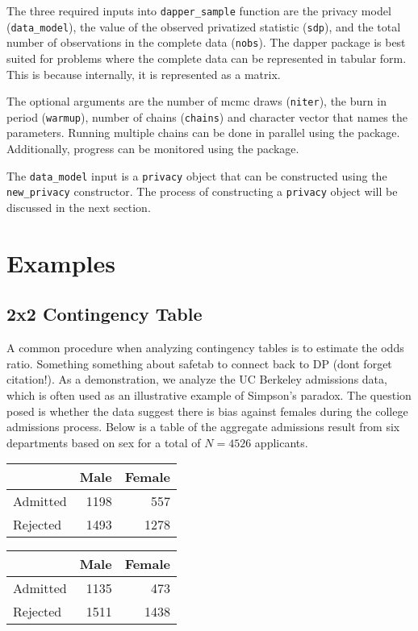 The three required inputs into \texttt{dapper\_sample} function are the privacy model (\texttt{data\_model}), the value
of the observed privatized statistic (\texttt{sdp}), and the total number of observations
in the complete data (\texttt{nobs}). The dapper
package is best suited for problems where the complete data can be represented in
tabular form. This is because internally, it is represented as a matrix.

The optional arguments are the number of mcmc draws (\texttt{niter}), the
burn in period (\texttt{warmup}), number of chains (\texttt{chains}) and character
vector that names the parameters. Running multiple chains can be done in parallel
using the  package. Additionally, progress can be monitored
using the  package.

The \texttt{data\_model} input is a \texttt{privacy}
object that can be constructed using the \texttt{new\_privacy} constructor. The
process of constructing a \texttt{privacy} object will be discussed in the next section.

\hypertarget{examples}{%
\section{Examples}\label{examples}}

\hypertarget{x2-contingency-table}{%
\subsection{2x2 Contingency Table}\label{x2-contingency-table}}

A common procedure when analyzing contingency tables is to estimate the
odds ratio. Something something about safetab to connect back to DP (dont forget citation!).
As a demonstration, we analyze the UC Berkeley admissions data, which is often
used as an illustrative example of Simpson's paradox. The question posed is whether
the data suggest there is bias against females during the college admissions
process. Below is a table of the aggregate admissions result from six departments based on sex
for a total of \(N = 4526\) applicants.

\begin{table}[!h]

\centering
\begin{tabular}[t]{lrr}
\toprule
  & Male & Female\\
\midrule
Admitted & 1198 & 557\\
Rejected & 1493 & 1278\\
\bottomrule
\end{tabular}
\centering
\begin{tabular}[t]{lrr}
\toprule
  & Male & Female\\
\midrule
Admitted & 1135 & 473\\
Rejected & 1511 & 1438\\
\bottomrule
\end{tabular}
\end{table}

